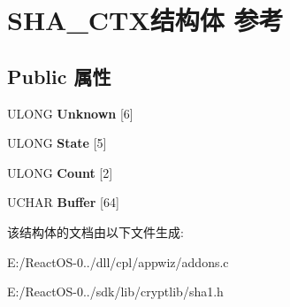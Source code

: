 \hypertarget{struct_s_h_a___c_t_x}{}\section{S\+H\+A\+\_\+\+C\+T\+X结构体 参考}
\label{struct_s_h_a___c_t_x}
\subsection*{Public 属性}
\begin{DoxyCompactItemize}
\item 
\mbox{\label{struct_s_h_a___c_t_x_ae4cff8ecf1081845d0ef019b92b4f412}} 
U\+L\+O\+NG {\bfseries Unknown} \mbox{[}6\mbox{]}
\item 
\mbox{\label{struct_s_h_a___c_t_x_a9d61eaa080743b4a8f050ba3d2005f0a}} 
U\+L\+O\+NG {\bfseries State} \mbox{[}5\mbox{]}
\item 
\mbox{\label{struct_s_h_a___c_t_x_a894d05de0d978bd39acd650f1f49bff9}} 
U\+L\+O\+NG {\bfseries Count} \mbox{[}2\mbox{]}
\item 
\mbox{\label{struct_s_h_a___c_t_x_a698624332c05395a9c4423f80e0ef5f9}} 
U\+C\+H\+AR {\bfseries Buffer} \mbox{[}64\mbox{]}
\end{DoxyCompactItemize}


该结构体的文档由以下文件生成\+:\begin{DoxyCompactItemize}
\item 
E\+:/\+React\+O\+S-\/0../dll/cpl/appwiz/addons.\+c\item 
E\+:/\+React\+O\+S-\/0../sdk/lib/cryptlib/sha1.\+h\end{DoxyCompactItemize}
